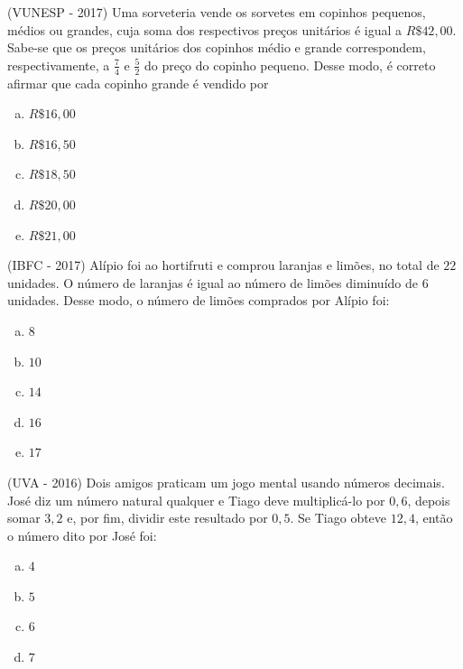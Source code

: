 \begin{exer}
 (VUNESP - 2017) Uma sorveteria vende os sorvetes em copinhos pequenos, médios ou grandes, cuja soma dos respectivos preços unitários é igual a $R\$ 42,00$. Sabe-se que os preços unitários dos copinhos médio e grande correspondem, respectivamente, a $\frac{7}{4}$ e $\frac{5}{2}$ do preço do copinho pequeno. Desse modo, é correto afirmar que cada copinho grande é vendido por
 \begin{multicols}{5}
 \begin{enumerate}[a)]
 \item $R\$ 16,00$
 \item $R\$ 16,50$
 \item $R\$ 18,50$
 \item $R\$ 20,00$
 \item $R\$ 21,00$
 \end{enumerate}
 \end{multicols}
 \end{exer}

 \begin{exer}
 (IBFC - 2017) Alípio foi ao hortifruti e comprou laranjas e limões, no total de $22$ unidades. O número de laranjas é igual ao número de limões diminuído de $6$ unidades. Desse modo, o número de limões comprados por Alípio foi:
 \begin{multicols}{5}
 \begin{enumerate}[a)]
 \item $8$
 \item $10$
 \item $14$
 \item $16$
 \item $17$
 \end{enumerate}
 \end{multicols}
 \end{exer}

 \begin{exer}
  (UVA - 2016) Dois amigos praticam um jogo mental usando números decimais. José diz um número natural qualquer e Tiago deve multiplicá-lo por $0,6$, depois somar $3,2$ e, por fim, dividir este resultado por $0,5$. Se Tiago obteve $12,4$, então o número dito por José foi:
 \begin{multicols}{5}
 \begin{enumerate}[a)]
 \item $4$
 \item $5$
 \item $6$
 \item $7$
 \end{enumerate}
 \end{multicols}
 \end{exer}

